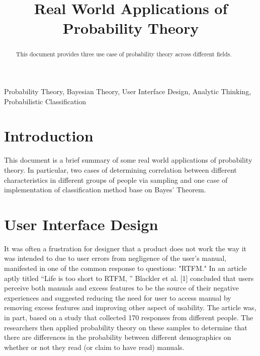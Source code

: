 \documentclass[conference]{IEEEtran}
\begin{document}
\title{Real World Applications of Probability Theory}

\author{
}

\maketitle

\begin{abstract}
This document provides three use case of probability theory across different fields.
\end{abstract}

\begin{IEEEkeywords}
Probability Theory, Bayesian Theory, User Interface Design, Analytic Thinking, Probabilistic Classification
\end{IEEEkeywords}

\section{Introduction}
This document is a brief summary of some real world applications of probability theory. 
In particular, two cases of determining correlation between different characteristics in different groups of people via sampling and one case of implementation of classification method base on Bayes' Theorem.

\section{User Interface Design}
It was often a frustration for designer that a product does not work the way it was intended to due to user errors from negligence of the user's manual, manifested in one of the common response to questions: "RTFM."
In an article aptly titled ``Life is too short to RTFM, '' Blackler et al. [1] concluded that users perceive both manuals and excess features to be the source of their negative experiences and suggested reducing the need for user to access manual by removing excess features and improving other aspect of usability. 
The article was, in part, based on a study that collected 170 responses from different people. The researchers then applied probability theory on these samples to determine that there are differences in the probability between different demographics on whether or not they read (or claim to have read) manuals.
\end{document}
